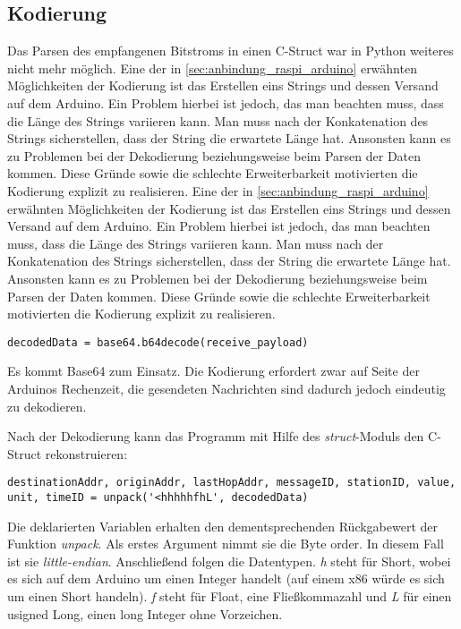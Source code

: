 \cite{sparkfun}   

\subsection{Kodierung}
\label{sec:kodierung}
Das Parsen des empfangenen Bitstroms in einen C-Struct war in Python weiteres nicht mehr möglich. 
Eine der in \ref{sec:anbindung_raspi_arduino} erwähnten Möglichkeiten der Kodierung ist das Erstellen eins Strings und dessen Versand auf dem Arduino. Ein Problem hierbei ist jedoch, das man beachten muss, dass die Länge des Strings variieren kann. Man muss nach der Konkatenation des Strings sicherstellen, dass der String die erwartete Länge hat. Ansonsten kann es zu Problemen bei der Dekodierung beziehungsweise beim Parsen der Daten kommen. Diese Gründe sowie die schlechte Erweiterbarkeit motivierten die Kodierung explizit zu realisieren. 
Eine der in \ref{sec:anbindung_raspi_arduino} erwähnten Möglichkeiten der Kodierung ist das Erstellen eins Strings und dessen Versand auf dem Arduino. Ein Problem hierbei ist jedoch, das man beachten muss, dass die Länge des Strings variieren kann. Man muss nach der Konkatenation des Strings sicherstellen, dass der String die erwartete Länge hat. Ansonsten kann es zu Problemen bei der Dekodierung beziehungsweise beim Parsen der Daten kommen. Diese Gründe sowie die schlechte Erweiterbarkeit motivierten die Kodierung explizit zu realisieren. 

\lstset{language=python, numbers=none}
\begin{lstlisting}
decodedData = base64.b64decode(receive_payload)
\end{lstlisting}
Es kommt Base64 zum Einsatz. Die Kodierung erfordert zwar auf Seite der Arduinos Rechenzeit, die gesendeten Nachrichten sind dadurch jedoch eindeutig zu dekodieren. 

Nach der Dekodierung kann das Programm mit Hilfe des \textit{struct}-Moduls den C-Struct rekonstruieren:  
\lstset{language=python, numbers=none, breaklines=true}
\begin{lstlisting}
destinationAddr, originAddr, lastHopAddr, messageID, stationID, value, unit, timeID = unpack('<hhhhhfhL', decodedData)
\end{lstlisting}
Die deklarierten Variablen erhalten den dementsprechenden Rückgabewert der Funktion \textit{unpack}. Als erstes Argument nimmt sie die Byte order. In diesem Fall ist sie \textit{little-endian}. Anschließend folgen die Datentypen. \textit{h} steht für Short, wobei es sich auf dem Arduino um einen Integer handelt (auf einem x86 würde es sich um einen Short handeln). \textit{f} steht für Float, eine Fließkommazahl und \textit{L} für einen usigned Long, einen long Integer ohne Vorzeichen. 

